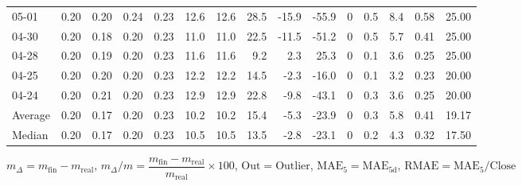 \begin{threeparttable}
{\begin{tabular}{lrrrrrrrrrrrrrr}
  05-01 &          0.20 &          0.20 &          0.24 &        0.23 &                12.6 &               12.6 &                28.5 &      -15.9 &        -55.9 &              0 &                 0.5 &              8.4 &            0.58 &                  25.00 \\
  04-30 &          0.20 &          0.18 &          0.20 &        0.23 &                11.0 &               11.0 &                22.5 &      -11.5 &        -51.2 &              0 &                 0.5 &              5.7 &            0.41 &                  25.00 \\
  04-28 &          0.20 &          0.19 &          0.20 &        0.23 &                11.6 &               11.6 &                 9.2 &        2.3 &         25.3 &              0 &                 0.1 &              3.6 &            0.25 &                  25.00 \\
  04-25 &          0.20 &          0.20 &          0.20 &        0.23 &                12.2 &               12.2 &                14.5 &       -2.3 &        -16.0 &              0 &                 0.1 &              3.2 &            0.23 &                  20.00 \\
  04-24 &          0.20 &          0.21 &          0.20 &        0.23 &                12.9 &               12.9 &                22.8 &       -9.8 &        -43.1 &              0 &                 0.3 &              3.6 &            0.25 &                  20.00 \\
Average &          0.20 &          0.17 &          0.20 &        0.23 &                10.2 &               10.2 &                15.4 &       -5.3 &        -23.9 &              0 &                 0.3 &              5.8 &            0.41 &                  19.17 \\
 Median &          0.20 &          0.17 &          0.20 &        0.23 &                10.5 &               10.5 &                13.5 &       -2.8 &        -23.1 &              0 &                 0.2 &              4.3 &            0.32 &                  17.50 \\
\bottomrule
\end{tabular}
}
\begin{tablenotes}\footnotesize
\item $m_\Delta=m_{\text{fin}}-m_{\text{real}}$,
$m_\Delta/m=\dfrac{m_{\text{fin}}-m_{\text{real}}}{m_{\text{real}}}\times100$,
$\mathrm{Out}=\text{Outlier}$,
$\mathrm{MAE}_5=\mathrm{MAE}_{5\text{d}}$,
$\mathrm{RMAE}=\mathrm{MAE}_5/\text{Close}$
\end{tablenotes}
\end{threeparttable}
\endgroup

